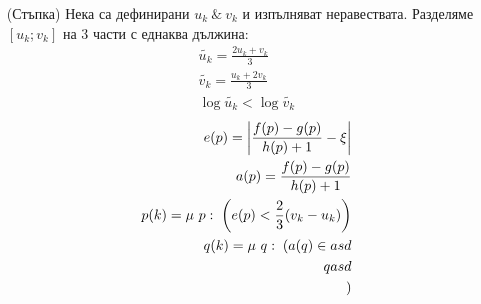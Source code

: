 \begin{solution}
\begin{itemize}
        \item[(Стъпка)] Нека са дефинирани $u_k\ \&\ v_k$ и изпълняват неравествата. Разделяме $[u_k;v_k]$ на 3 части с еднаква дължина:
              \begin{equation}
                  \begin{split}
                      \tilde{u_k} = \frac{2u_k + v_k}{3} \\
                      \tilde{v_k} = \frac{u_k + 2v_k}{3} \\
                      \log \tilde{u_k} < \log \tilde{v_k}
                  \end{split}
              \end{equation}
              \begin{equation}
                  \begin{split}
                      e(p) = \left|\frac{f(p) - g(p)}{h(p) + 1} - \xi\right|              \\
                      a(p) = \frac{f(p) - g(p)}{h(p) + 1}                          \\
                      p(k) = \mu\ p:\; \left( e(p) < \frac{2}{3}(v_k - u_k)\right) \\
                      q(k) = \mu\ q:\; ( a(q) \in asd                              \\q
                      asd                                                          \\
                      )
                  \end{split}
              \end{equation}
    \end{itemize}
\end{solution}

